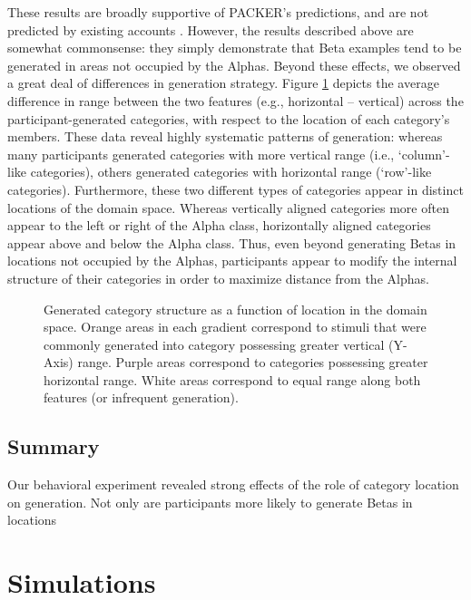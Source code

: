 \documentclass[10pt,letterpaper]{article}
\newcommand\inputpgf[2]{{
\let\pgfimageWithoutPath\pgfimage
\renewcommand{\pgfimage}[2][]{\pgfimageWithoutPath[##1]{#1/##2}}

}}
\begin{document}
These results are broadly supportive of PACKER's predictions, and are not predicted by existing accounts \citep[i.e.,][]{jern2013probabilistic}. However, the results described above are somewhat commonsense: they simply demonstrate that Beta examples tend to be generated in areas not occupied by the Alphas. Beyond these effects, we observed a great deal of differences in generation strategy. Figure \ref{fig:range-diff-gradient} depicts the average difference in range between the two features (e.g., horizontal -- vertical) across the participant-generated categories, with respect to the location of each category's members. These data reveal highly systematic patterns of generation: whereas many participants generated categories with more vertical range (i.e., `column'-like categories), others generated categories with horizontal range (`row'-like categories). Furthermore, these two different types of categories appear in distinct locations of the domain space. Whereas vertically aligned categories more often appear to the left or right of the Alpha class, horizontally aligned categories appear above and below the Alpha class. Thus, even beyond generating Betas in locations not occupied by the Alphas, participants appear to modify the internal structure of their categories in order to maximize distance from the Alphas.

\begin{figure}[ht!]
    \begin{center}
    \inputpgf{figs/}{range-diff-gradient.pgf}
    \caption{Generated category structure as a function of location in the domain space. Orange areas in each gradient correspond to stimuli that were commonly generated into category possessing greater vertical (Y-Axis) range. Purple areas correspond to categories possessing greater horizontal range. White areas correspond to equal range along both features (or infrequent generation).}
    \label{fig:range-diff-gradient}
    \end{center}
\end{figure}

\subsection{Summary}

Our behavioral experiment revealed strong effects of the role of category location on generation. Not only are participants more likely to generate Betas in locations

\section{Simulations}
\end{document}
